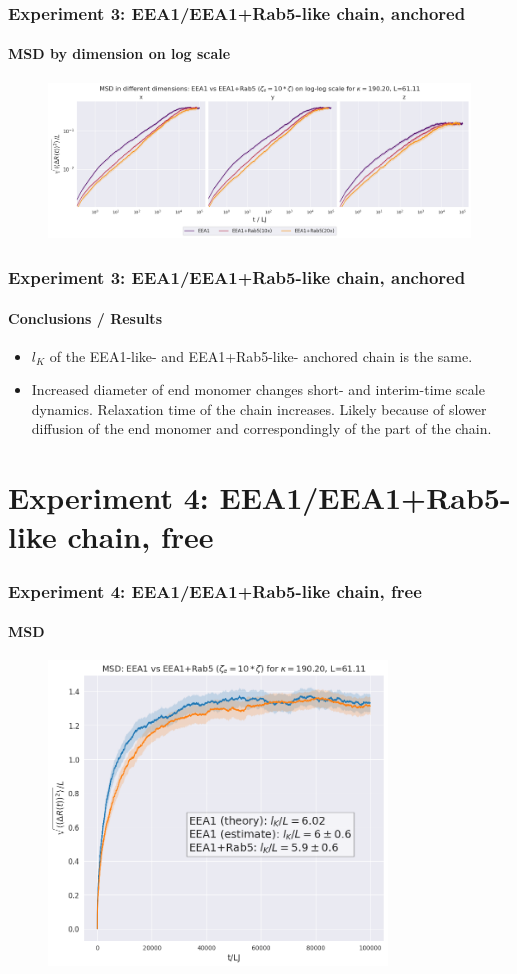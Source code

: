 \documentclass[handout]{beamer}
\begin{document}
\begin{frame}
    \frametitle{Experiment 3: EEA1/EEA1+Rab5-like chain, anchored}
    \framesubtitle{MSD by dimension on log scale}
    \begin{figure}[h]
        \includegraphics[width=11.2cm]{./14+15+16-exp-msd-dim-log.png}
    \end{figure}
\end{frame}

\begin{frame}
    \frametitle{Experiment 3: EEA1/EEA1+Rab5-like chain, anchored}
    \framesubtitle{Conclusions / Results}
    \begin{itemize}
        \item $l_K$ of the EEA1-like- and EEA1+Rab5-like- anchored chain is the same.
        \item Increased diameter of end monomer changes short- and interim-time scale 
        dynamics. Relaxation time of the chain increases. Likely because of slower
        diffusion of the end monomer and correspondingly of the part of the chain.
    \end{itemize}
\end{frame}

\section{Experiment 4: EEA1/EEA1+Rab5-like chain, free}

\begin{frame}
    \frametitle{Experiment 4: EEA1/EEA1+Rab5-like chain, free}
    \framesubtitle{MSD}
    \begin{figure}[h]
        \includegraphics[width=9cm]{./17-exp-msd.png}
    \end{figure}
\end{frame}
\end{document}
